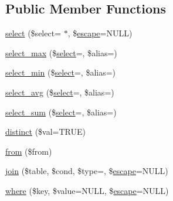 \subsection*{Public Member Functions}
\begin{DoxyCompactItemize}
\item 
\mbox{\hyperlink{class_c_i___d_b__query__builder_a406a7ea81e717e56496f61baf3e03f44}{select}} (\$select=\textquotesingle{} $\ast$\textquotesingle{}, \$\mbox{\hyperlink{class_c_i___d_b__driver_ac8f37ca5703d4558c732e692194f8cd6}{escape}}=N\+U\+LL)
\item 
\mbox{\hyperlink{class_c_i___d_b__query__builder_a4eac30ba8703ba8f62664e3b4ea1a177}{select\+\_\+max}} (\$\mbox{\hyperlink{class_c_i___d_b__query__builder_a406a7ea81e717e56496f61baf3e03f44}{select}}=\textquotesingle{}\textquotesingle{}, \$alias=\textquotesingle{}\textquotesingle{})
\item 
\mbox{\hyperlink{class_c_i___d_b__query__builder_ab8cf650dd779435da91d6f50bf082528}{select\+\_\+min}} (\$\mbox{\hyperlink{class_c_i___d_b__query__builder_a406a7ea81e717e56496f61baf3e03f44}{select}}=\textquotesingle{}\textquotesingle{}, \$alias=\textquotesingle{}\textquotesingle{})
\item 
\mbox{\hyperlink{class_c_i___d_b__query__builder_a0377f6833e394c977823e21413772761}{select\+\_\+avg}} (\$\mbox{\hyperlink{class_c_i___d_b__query__builder_a406a7ea81e717e56496f61baf3e03f44}{select}}=\textquotesingle{}\textquotesingle{}, \$alias=\textquotesingle{}\textquotesingle{})
\item 
\mbox{\hyperlink{class_c_i___d_b__query__builder_a42348c349cf2fa7ca0210087efcf98d3}{select\+\_\+sum}} (\$\mbox{\hyperlink{class_c_i___d_b__query__builder_a406a7ea81e717e56496f61baf3e03f44}{select}}=\textquotesingle{}\textquotesingle{}, \$alias=\textquotesingle{}\textquotesingle{})
\item 
\mbox{\hyperlink{class_c_i___d_b__query__builder_a65b172f03eea17b7fa243f5732a592bd}{distinct}} (\$val=T\+R\+UE)
\item 
\mbox{\hyperlink{class_c_i___d_b__query__builder_a91f5f004ed8e2237a4decc5d23ac3457}{from}} (\$from)
\item 
\mbox{\hyperlink{class_c_i___d_b__query__builder_a54557b1ef757507cbbd2a8802a99810b}{join}} (\$table, \$cond, \$type=\textquotesingle{}\textquotesingle{}, \$\mbox{\hyperlink{class_c_i___d_b__driver_ac8f37ca5703d4558c732e692194f8cd6}{escape}}=N\+U\+LL)
\item 
\mbox{\hyperlink{class_c_i___d_b__query__builder_a2356c4b7b93fb83c62a354a8a0748222}{where}} (\$key, \$value=N\+U\+LL, \$\mbox{\hyperlink{class_c_i___d_b__driver_ac8f37ca5703d4558c732e692194f8cd6}{escape}}=N\+U\+LL)

\end{DoxyCompactItemize}
